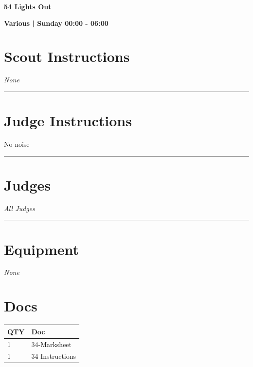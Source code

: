 \documentclass[10pt]{article}
\newcommand{\newtitle}[1]{\begin{center}{\Huge\bfseries #1 }\\ \vspace{5mm}\end{center}}
\newcommand{\newsubtitle}[1]{\begin{center}{\color{grey}\Large\bfseries #1 }\\ \vspace{5mm}\end{center}}
\begin{document}
	\vspace{1cm}


	\clearpage
		\newtitle{54 Lights Out }
	\newsubtitle{Various | Sunday 00:00 - 06:00}
		\setcounter{section}{53}
	\section*{Scout Instructions}
		\textit{None}
	
	\vspace{0.5cm}
	\hrule
	\vspace{0.5cm}

		\section*{Judge Instructions}
		No noise
\vspace{0.5cm}
	\hrule
	\vspace{0.5cm}
		\section*{\faUsers \: Judges}

					\textit{All Judges}
			\vspace{0.5cm}
	\hrule
	\vspace{0.5cm}

	\begin{multicols}{2}

		\section*{\faWrench \: Equipment}

				\textit{None}
		
		\vfill\null
		\columnbreak

			\section*{\faFile \: Docs}
		 	\begin{center}
			\begin{tabular}{p{2cm}p{4cm}}

			\textbf{QTY} & \textbf{Doc} \\\toprule
										1&34-Marksheet\\\midrule
										1&34-Instructions\\\midrule
							\end{tabular}
			\end{center}
	

		\vfill\null

		\end{multicols}
\end{document}
